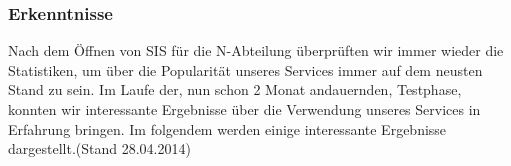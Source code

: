 \subsubsection{Erkenntnisse} \label{sec:content_draft_log_erkenn}
%
Nach dem Öffnen von SIS für die N-Abteilung überprüften wir immer wieder die Statistiken, um über die Popularität unseres Services immer auf dem neusten Stand zu sein. Im Laufe der, nun schon 2 Monat andauernden, Testphase, konnten wir interessante Ergebnisse über die Verwendung unseres Services in Erfahrung bringen. Im folgendem werden einige interessante Ergebnisse dargestellt.(Stand 28.04.2014)\\

